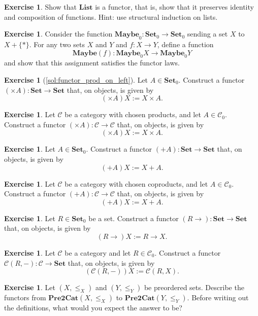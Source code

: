 \documentclass[a4paper,11pt, oneside,titlepage=false]{scrbook}
\theoremstyle{plain}
\theoremstyle{definition}
\newtheorem{exer}[thm]{Exercise}
\newcommand{\Cat}[1]{\mathcal{#1}}
\newcommand{\CC}{\Cat{C}}
\newcommand{\Catb}[1]{\mathbf{#1}}
\newcommand{\List}{\Catb{List}}
\newcommand{\Maybe}{\Catb{Maybe}}
\newcommand{\SET}{\Catb{Set}}
\newcommand{\PREtoCAT}{\Catb{Pre2Cat}}
\newcommand{\Ob}[1]{{#1}_0}
\newcommand{\CHom}[3]{{#1}(#2,#3)}
\begin{document}
\begin{exer}
  Show that $\List$ is a  functor, that is, show that it preserves identity and composition of functions.
  Hint: use structural induction on lists.
\end{exer}

\begin{exer}
  Consider the function $\Ob{\Maybe} : \Ob\SET \to \Ob\SET$ sending a set $X$ to $X + \{*\}$.
  For any two sets $X$ and $Y$ and $f : X \to Y$, define a function
  \[ \Maybe(f) : \Ob\Maybe X \to \Ob\Maybe Y\]
  and show that this assignment satisfies the functor laws.
\end{exer}

\begin{exer}[\cref{sol:functor_prod_on_left}]\label{exer:functor_prod_on_left}
  Let $A \in \Ob\SET$.
  Construct a functor $(\times A) : \SET \to \SET$ that, on objects, is given by
  \[ (\times A) X := X \times A. \]
\end{exer}


\begin{exer}
  Let $\CC$ be a category with chosen products, and let $A \in \Ob\CC$.
  Construct a functor $(\times A) : \CC \to \CC$ that, on objects, is given by
  \[ (\times A) X := X \times A. \]
\end{exer}

\begin{exer}
  Let $A \in \Ob\SET$.
  Construct a functor $(+ A) : \SET \to \SET$ that, on objects, is given by
  \[ (+ A) X := X + A. \]
\end{exer}

\begin{exer}
  Let $\CC$ be a category with chosen coproducts, and let $A \in \Ob\CC$.
  Construct a functor $(+ A) : \CC \to \CC$ that, on objects, is given by
  \[ (+ A) X := X + A. \]
\end{exer}

\begin{exer}
  Let $R \in \Ob\SET$ be a set.
  Construct a functor $(R \to) : \SET \to \SET$ that, on objects, is given by
  \[ (R \to) X := R \to X. \]
\end{exer}

\begin{exer}
  Let $\CC$ be a category and let $R \in \Ob\CC$.
  Construct a functor $\CHom \CC R - : \CC \to \SET$ that, on objects, is given by
  \[ (\CHom \CC R -) X := \CHom \CC R X. \]
\end{exer}


\begin{exer}\label{ex:poset_functors}
  Let $(X,\leq_X)$ and $(Y,\leq_Y)$ be preordered sets.
  Describe the functors from $\PREtoCAT(X,\leq_X)$ to $\PREtoCAT(Y,\leq_Y)$.
  Before writing out the definitions, what would you expect the answer to be?
\end{exer}
\end{document}
